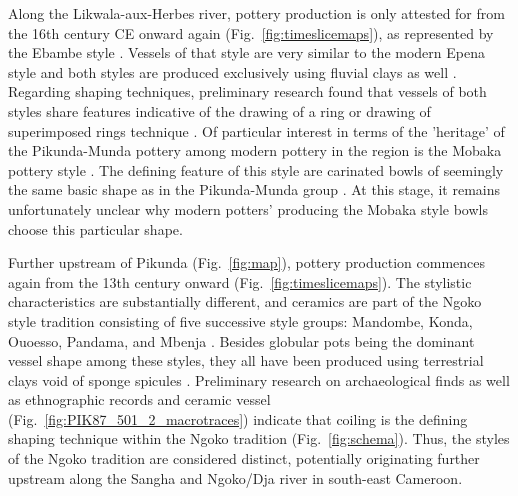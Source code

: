 \documentclass[smallextended,natbib]{svjour3}       %
\begin{document}
Along the Likwala-aux-Herbes river, pottery production is only attested for from the 16th century CE onward again (Fig.~\ref{fig:timeslicemaps}), as represented by the Ebambe style \citep[Fig.~\ref{fig:sangahtypes}.22-23;][131--136]{Seidensticker.2021e}. Vessels of that style are very similar to the modern Epena style \citep[Fig.~\ref{fig:sangahtypes}.25-26][137--141]{Seidensticker.2021e} and both styles are produced exclusively using fluvial clays as well \citep{Seidensticker.2020}. Regarding shaping techniques, preliminary research found that vessels of both styles share features indicative of the drawing of a ring or drawing of superimposed rings technique \citep[Fig.~\ref{fig:schema};][55--57 Fig.~17--18]{Seidensticker.2021e}. Of particular interest in terms of the 'heritage' of the Pikunda-Munda pottery among modern pottery in the region is the Mobaka pottery style \citep[141--144]{Seidensticker.2021e}. The defining feature of this style are carinated bowls of seemingly the same basic shape as in the Pikunda-Munda group \citep[Fig.~\ref{fig:sangahtypes}.24;][142 Fig.~63.1,64]{Seidensticker.2021e}. At this stage, it remains unfortunately unclear why modern potters' producing the Mobaka style bowls choose this particular shape.

Further upstream of Pikunda (Fig.~\ref{fig:map}), pottery production commences again from the 13th century onward (Fig.~\ref{fig:timeslicemaps}). The stylistic characteristics are substantially different, and ceramics are part of the Ngoko style tradition consisting of five successive style groups: Mandombe, Konda, Ouoesso, Pandama, and Mbenja \citep[Fig.~\ref{fig:sangahtypes}.13--21;][145--162]{Seidensticker.2021e}. Besides globular pots being the dominant vessel shape among these styles, they all have been produced using terrestrial clays void of sponge spicules \citep[Fig.~\ref{fig:thinsections}.J--K;][]{Seidensticker.2020}. Preliminary research on archaeological finds \citep[Fig.~\ref{fig:PIK87_1-2_3_macrotraces}--\ref{fig:PIK87_1_macrotraces};][53--54 Fig.~16B]{Seidensticker.2021e} as well as ethnographic records and ceramic vessel (Fig.~\ref{fig:PIK87_501_2_macrotraces}) indicate that coiling is the defining shaping technique within the Ngoko tradition (Fig.~\ref{fig:schema}). Thus, the styles of the Ngoko tradition are considered distinct, potentially originating further upstream along the Sangha and Ngoko/Dja river in south-east Cameroon. 

\end{document}
